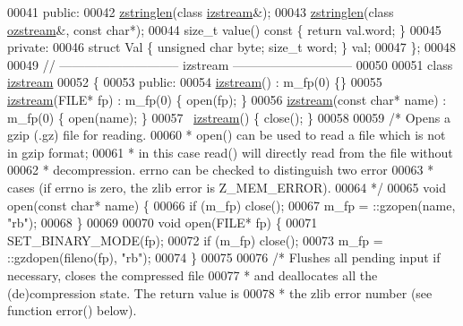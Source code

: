 \begin{DoxyCode}
00041 \textcolor{keyword}{public}:
00042     \hyperlink{classzstringlen}{zstringlen}(\textcolor{keyword}{class} \hyperlink{classizstream}{izstream}&);
00043     \hyperlink{classzstringlen}{zstringlen}(\textcolor{keyword}{class} \hyperlink{classozstream}{ozstream}&, \textcolor{keyword}{const} \textcolor{keywordtype}{char}*);
00044     \textcolor{keywordtype}{size\_t} value()\textcolor{keyword}{ const }\{ \textcolor{keywordflow}{return} val.word; \}
00045 \textcolor{keyword}{private}:
00046     \textcolor{keyword}{struct }Val \{ \textcolor{keywordtype}{unsigned} \textcolor{keywordtype}{char} byte; \textcolor{keywordtype}{size\_t} word; \} val;
00047 \};
00048 
00049 \textcolor{comment}{//  ----------------------------- izstream -----------------------------}
00050 
00051 \textcolor{keyword}{class }\hyperlink{classizstream}{izstream}
00052 \{
00053     \textcolor{keyword}{public}:
00054         \hyperlink{classizstream}{izstream}() : m\_fp(0) \{\}
00055         \hyperlink{classizstream}{izstream}(FILE* fp) : m\_fp(0) \{ open(fp); \}
00056         \hyperlink{classizstream}{izstream}(\textcolor{keyword}{const} \textcolor{keywordtype}{char}* name) : m\_fp(0) \{ open(name); \}
00057         ~\hyperlink{classizstream}{izstream}() \{ close(); \}
00058 
00059         \textcolor{comment}{/* Opens a gzip (.gz) file for reading.}
00060 \textcolor{comment}{         * open() can be used to read a file which is not in gzip format;}
00061 \textcolor{comment}{         * in this case read() will directly read from the file without}
00062 \textcolor{comment}{         * decompression. errno can be checked to distinguish two error}
00063 \textcolor{comment}{         * cases (if errno is zero, the zlib error is Z\_MEM\_ERROR).}
00064 \textcolor{comment}{         */}
00065         \textcolor{keywordtype}{void} open(\textcolor{keyword}{const} \textcolor{keywordtype}{char}* name) \{
00066             \textcolor{keywordflow}{if} (m\_fp) close();
00067             m\_fp = ::gzopen(name, \textcolor{stringliteral}{"rb"});
00068         \}
00069 
00070         \textcolor{keywordtype}{void} open(FILE* fp) \{
00071             SET\_BINARY\_MODE(fp);
00072             \textcolor{keywordflow}{if} (m\_fp) close();
00073             m\_fp = ::gzdopen(fileno(fp), \textcolor{stringliteral}{"rb"});
00074         \}
00075 
00076         \textcolor{comment}{/* Flushes all pending input if necessary, closes the compressed file}
00077 \textcolor{comment}{         * and deallocates all the (de)compression state. The return value is}
00078 \textcolor{comment}{         * the zlib error number (see function error() below).}

\end{DoxyCode}
